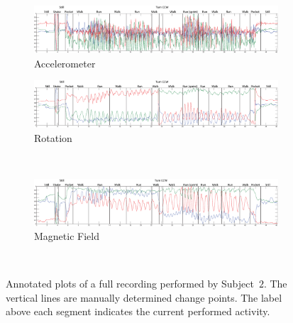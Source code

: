 \begin{figure}
  \centering
  \begin{subfigure}[b]{1\textwidth}
    \includegraphics[width=\textwidth]{./Figures/chapter6/data_collection/run-1-walk-run-roemer/data_plot_acc_annotated.eps}
    \caption{Accelerometer}
    \label{fig:recording_subject_1_run_1_accelerometer}
  \end{subfigure}

  \begin{subfigure}[b]{1\textwidth}
    \includegraphics[width=\textwidth]{./Figures/chapter6/data_collection/run-1-walk-run-roemer/data_plot_rot_annotated.eps}
    \caption{Rotation}
    \label{fig:recording_subject_1_run_1_rotation}
  \end{subfigure} \\

  \begin{subfigure}[b]{1\textwidth}
    \includegraphics[width=\textwidth]{./Figures/chapter6/data_collection/run-1-walk-run-roemer/data_plot_mag_annotated.eps}
    \caption{Magnetic Field}
    \label{fig:recording_subject_1_run_1_magnetic}
  \end{subfigure} \\
  \caption[Plots]{Annotated plots of a full recording performed by Subject~$2$. The vertical lines are manually determined change points. The label above each segment indicates the current performed activity.}\label{fig:plots_subject_2}
\end{figure}


